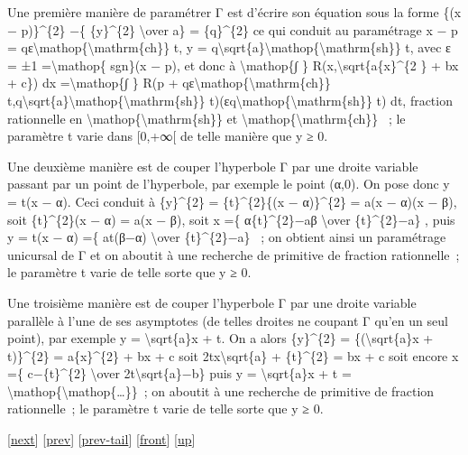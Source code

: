 \documentclass[]{article}
\begin{document}
Une première manière de paramétrer Γ est d'écrire son équation sous la
forme \{(x − p)\}\^{}\{2\} −\{ \{y\}\^{}\{2\} \textbackslash{}over a\} =
\{q\}\^{}\{2\} ce qui conduit au paramétrage x − p =
qε\textbackslash{}mathop\{\textbackslash{}mathrm\{ch\}\} t, y =
q\textbackslash{}sqrt\{a\}\textbackslash{}mathop\{\textbackslash{}mathrm\{sh\}\}
t, avec ε = ±1 =\textbackslash{}mathop\{ sgn\}(x − p), et donc à
\textbackslash{}mathop\{∫ \} R(x,\textbackslash{}sqrt\{a\{x\}\^{}\{2 \}
+ bx + c\}) dx =\textbackslash{}mathop\{∫ \} R(p +
qε\textbackslash{}mathop\{\textbackslash{}mathrm\{ch\}\}
t,q\textbackslash{}sqrt\{a\}\textbackslash{}mathop\{\textbackslash{}mathrm\{sh\}\}
t)(εq\textbackslash{}mathop\{\textbackslash{}mathrm\{sh\}\} t) dt,
fraction rationnelle en
\textbackslash{}mathop\{\textbackslash{}mathrm\{sh\}\} et
\textbackslash{}mathop\{\textbackslash{}mathrm\{ch\}\} ~; le paramètre t
varie dans {[}0,+∞{[} de telle manière que y ≥ 0.

Une deuxième manière est de couper l'hyperbole Γ par une droite variable
passant par un point de l'hyperbole, par exemple le point (α,0). On pose
donc y = t(x − α). Ceci conduit à \{y\}\^{}\{2\} = \{t\}\^{}\{2\}\{(x −
α)\}\^{}\{2\} = a(x − α)(x − β), soit \{t\}\^{}\{2\}(x − α) = a(x − β),
soit x =\{ α\{t\}\^{}\{2\}−aβ \textbackslash{}over \{t\}\^{}\{2\}−a\} ,
puis y = t(x − α) =\{ at(β−α) \textbackslash{}over \{t\}\^{}\{2\}−a\} ~;
on obtient ainsi un paramétrage unicursal de Γ et on aboutit à une
recherche de primitive de fraction rationnelle~; le paramètre t varie de
telle sorte que y ≥ 0.

Une troisième manière est de couper l'hyperbole Γ par une droite
variable parallèle à l'une de ses asymptotes (de telles droites ne
coupant Γ qu'en un seul point), par exemple y =
\textbackslash{}sqrt\{a\}x + t. On a alors \{y\}\^{}\{2\} =
\{(\textbackslash{}sqrt\{a\}x + t)\}\^{}\{2\} = a\{x\}\^{}\{2\} + bx + c
soit 2tx\textbackslash{}sqrt\{a\} + \{t\}\^{}\{2\} = bx + c soit encore
x =\{ c−\{t\}\^{}\{2\} \textbackslash{}over
2t\textbackslash{}sqrt\{a\}−b\} puis y = \textbackslash{}sqrt\{a\}x + t
= \textbackslash{}mathop\{\textbackslash{}mathop\{\ldots{}\}\}~; on
aboutit à une recherche de primitive de fraction rationnelle~; le
paramètre t varie de telle sorte que y ≥ 0.

{[}\href{coursse54.html}{next}{]} {[}\href{coursse52.html}{prev}{]}
{[}\href{coursse52.html\#tailcoursse52.html}{prev-tail}{]}
{[}\href{coursse53.html}{front}{]}
{[}\href{coursch10.html\#coursse53.html}{up}{]}
\end{document}
